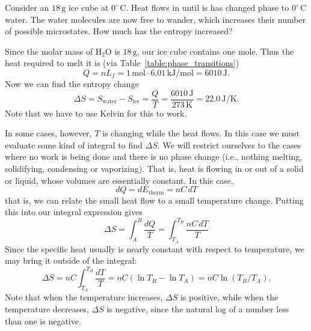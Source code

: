 \begin{example}
  Consider an $18\,\text{g}$ ice cube at $0^\circ\,\text{C}$.  Heat
  flows in until is has changed phase to $0^\circ\,\text{C}$ water.
  The water molecules are now free to wander, which increases their
  number of possible microstates.  How much has the entropy increased?



\solution Since the molar mass of H$_2$O is $18\,\text{g}$, our ice
cube contains one mole.  Thus the heat required to melt it is (via
Table~\ref{table:phase_transitions})
\begin{equation}
Q = n L_f = 1\,\text{mol} \cdot 6.01\,\text{kJ/mol} = 6010 \,\text{J}.
\end{equation}
Now we can find the entropy change
\begin{equation}
\Delta S = S_\text{water} - S_\text{ice}= \frac{Q}{T}=
\frac{6010\,\text{J}}{273\,\text{K}}= 22.0 \,\text{J/K}.
\end{equation}
Note that we have to use Kelvin for this to work.
\end{example}

In some cases, however, $T$ is changing while the heat flows.  In this
case we must evaluate some kind of integral to find $\Delta S$.  We
will restrict ourselves to the cases where no work is being done and
there is no phase change (i.e., nothing melting, solidifying,
condensing or vaporizing).  That is, heat is flowing in or out of a
solid or liquid, whose volumes are essentially constant.  In this
case,
\begin{equation}
dQ = dE_\text{therm} = nC\,dT
\end{equation}
that is, we can relate the small heat flow to a small temperature
change. Putting this into our integral expression gives
\begin{equation}
\Delta S = \int_A^B \frac{dQ}{T}= \int_{T_A}^{T_B} \frac{nC\,dT}{T} 
\end{equation}
Since the specific heat usually is nearly constant with respect to
temperature, we may bring it outside of the integral:
\begin{equation}
\Delta S = nC\int_{T_A}^{T_B} \frac{dT}{T} = nC(\ln T_B -\ln T_A)
 = nC\ln(T_B/T_A).
\end{equation}
Note that when the temperature increases, $\Delta S$ is positive,
while when the temperature decreases, $\Delta S$ is negative, since
the natural log of a number less than one is negative.

